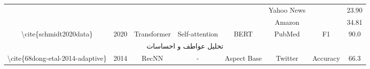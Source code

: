 \begin{table}[]
\begin{tabular}{|c|c|c|c|c|c|cc|}
                                                                                          &                                            &                                                   &                                                           &                                                                                                                        & Yahoo News                                            & \multicolumn{1}{c|}{}                                                                                                              & 23.90                      \\ \cline{6-6} \cline{8-8} 
                                                                                          &                                            &                                                   &                                                           &                                                                                                                        & Amazon                                                & \multicolumn{1}{c|}{}                                                                                                              & 34.81                      \\ \hline
    \textbackslash{}cite\{schmidt2020data\}                                               & 2020                                       & Transformer                                       & Self-attention                                            & BERT                                                                                                                   & PubMed                                                & \multicolumn{1}{c|}{F1}                                                                                                            & 90.0                       \\ \hline
    \multicolumn{8}{|c|}{تحلیل عواطف و احساسات}                                                                                                                                                                                                                                                                                                                                                                                                                                                                                                                                                           \\ \hline
    \multirow{2}{*}{\textbackslash{}cite\{68dong-etal-2014-adaptive\}}                    & \multirow{2}{*}{2014}                      & \multirow{2}{*}{RecNN}                            & \multirow{2}{*}{-}                                        & \multirow{2}{*}{Aspect Base}                                                                                           & \multirow{2}{*}{Twitter}                              & \multicolumn{1}{c|}{Accuracy}                                                                                                      & 66.3                       \\ \cline{7-8} 

\end{tabular}
\end{table}
